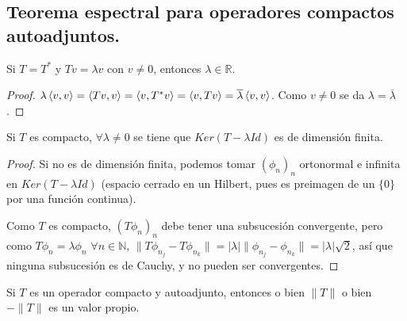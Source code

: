 \subsection{Teorema espectral para operadores compactos autoadjuntos.}

\begin{proposition}
  \label{prop:autoadj-real-eigenvalues} Si $T=T^*$ y  $Tv=\lambda v$ con $v\neq 0$, entonces $\lambda\in \mathbb{R}$. \end{proposition}

\begin{proof}
  $\lambda \left\langle v,v\right\rangle =
  \left\langle Tv,v\right\rangle=\left\langle v,T^*v\right\rangle=\left\langle v,Tv\right\rangle=\overline{\lambda}\left\langle v,v\right\rangle$. Como
  $v\neq 0$ se da $\lambda=\overline{\lambda}$.
\end{proof}

\begin{proposition}
  \label{prop:eigenspaces-finite-dim}
  Si $T$ es compacto, $\forall \lambda\neq 0$ se tiene que $Ker(T-\lambda Id)$
  es de dimensión finita.
\end{proposition}

\begin{proof}
  Si no es de dimensión finita, podemos tomar $(\phi_n)_n$ ortonormal e infinita
  en $Ker(T-\lambda Id)$ (espacio cerrado en un Hilbert, pues es preimagen de un
  $\{0\}$ por una función continua).

  Como $T$ es compacto, $(T\phi_n)_n$ debe tener una subsucesión convergente,
  pero como $T\phi_n=\lambda \phi_n$ $\forall n\in \mathbb{N}$,
  $\|T\phi_{n_j}-T\phi_{n_k}\|=|\lambda|\|\phi_{n_j}-\phi_{n_k}\|=|\lambda|\sqrt{2}
  $, así que ninguna subsucesión es de Cauchy, y no pueden ser convergentes.
\end{proof}

\begin{proposition}
  \label{prop:norm-eigenval}
  Si $T$ es un operador compacto y autoadjunto, entonces o bien $\|T\|$ o bien
  $-\|T\|$ es un valor propio.
\end{proposition}

